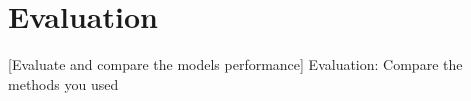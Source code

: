 \section{Evaluation}
[Evaluate and compare the models performance]
Evaluation: Compare the methods you used